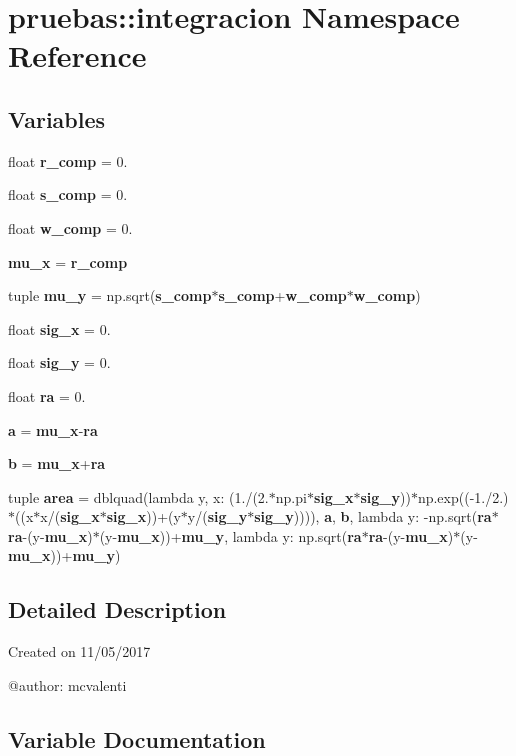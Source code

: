 \section{pruebas\-:\-:integracion \-Namespace \-Reference}
\label{namespacepruebas_1_1integracion}
\subsection*{\-Variables}
\begin{DoxyCompactItemize}
\item 
float {\bf r\-\_\-comp} = 0.
\item 
float {\bf s\-\_\-comp} = 0.
\item 
float {\bf w\-\_\-comp} = 0.
\item 
{\bf mu\-\_\-x} = {\bf r\-\_\-comp}
\item 
tuple {\bf mu\-\_\-y} = np.\-sqrt({\bf s\-\_\-comp}$\ast${\bf s\-\_\-comp}+{\bf w\-\_\-comp}$\ast${\bf w\-\_\-comp})
\item 
float {\bf sig\-\_\-x} = 0.
\item 
float {\bf sig\-\_\-y} = 0.
\item 
float {\bf ra} = 0.
\item 
{\bf a} = {\bf mu\-\_\-x}-\/{\bf ra}
\item 
{\bf b} = {\bf mu\-\_\-x}+{\bf ra}
\item 
tuple {\bf area} = dblquad(lambda y, x\-: (1./(2.$\ast$np.\-pi$\ast${\bf sig\-\_\-x}$\ast${\bf sig\-\_\-y}))$\ast$np.\-exp((-\/1./2.)$\ast$((x$\ast$x/({\bf sig\-\_\-x}$\ast${\bf sig\-\_\-x}))+(y$\ast$y/({\bf sig\-\_\-y}$\ast${\bf sig\-\_\-y})))), {\bf a}, {\bf b}, lambda y\-: -\/np.\-sqrt({\bf ra}$\ast${\bf ra}-\/(y-\/{\bf mu\-\_\-x})$\ast$(y-\/{\bf mu\-\_\-x}))+{\bf mu\-\_\-y}, lambda y\-: np.\-sqrt({\bf ra}$\ast${\bf ra}-\/(y-\/{\bf mu\-\_\-x})$\ast$(y-\/{\bf mu\-\_\-x}))+{\bf mu\-\_\-y})
\end{DoxyCompactItemize}


\subsection{\-Detailed \-Description}
\begin{DoxyVerb}
Created on 11/05/2017

@author: mcvalenti
\end{DoxyVerb}
 

\subsection{\-Variable \-Documentation}
